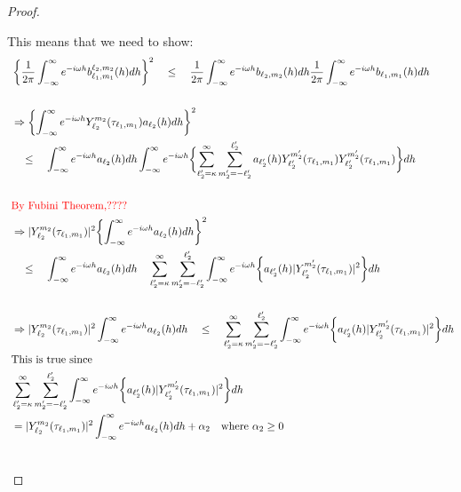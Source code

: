 \documentclass[11pt]{article}
\begin{document}
\begin{itemize}
\begin{proof}
\begin{enumerate}


This means that we need to show:\\
\begin{align*}
&\left\{ \frac{1}{2\pi} \int_{-\infty}^\infty e^{-i\omega h} b_{\ell_1,m_1}^{\ell_2,m_2}(h) dh \right\}^2 \quad \le \quad \frac{1}{2\pi} \int_{-\infty}^\infty e^{-i\omega h} b_{\ell_2,m_2}(h) dh \frac{1}{2\pi} \int_{-\infty}^\infty e^{-i\omega h} b_{\ell_1,m_1}(h) dh \\
\\
&\Rightarrow \left\{ \int_{-\infty}^\infty e^{-i\omega h} Y_{\ell_2}^{m_2}(\tau_{\ell_1,m_1}) a_{\ell_2}(h) dh \right\}^2\\ 
&\quad \le \quad \int_{-\infty}^\infty e^{-i\omega h} a_{\ell_2}(h) dh \int_{-\infty}^\infty e^{-i\omega h} \biggl\{ \sum_{\ell_2'=\kappa}^{\infty} \sum_{m_2'=-\ell_2'}^{\ell_2'} a_{\ell_2'}(h) Y_{\ell_2'}^{m_2'}(\tau_{\ell_1,m_1}) Y_{\ell_2'}^{m_2'}(\tau_{\ell_1,m_1}) \biggl\} dh\\
\\
&\text{{\color{red} By Fubini Theorem,????}}\\
&\Rightarrow |Y_{\ell_2}^{m_2}(\tau_{\ell_1,m_1})|^2 \biggl\{\int_{-\infty}^\infty e^{-i\omega h} a_{\ell_2}(h) dh \biggl\}^2\\
& \quad \le \quad \int_{-\infty}^\infty e^{-i\omega h} a_{\ell_2}(h) dh \quad \sum_{\ell_2'=\kappa}^{\infty} \sum_{m_2'=-\ell_2'}^{\ell_2'} \int_{-\infty}^\infty e^{-i\omega h} \biggl\{ a_{\ell_2'}(h) |Y_{\ell_2'}^{m_2'}(\tau_{\ell_1,m_1})|^2\biggl\} dh\\
\\
&\Rightarrow |Y_{\ell_2}^{m_2}(\tau_{\ell_1,m_1})|^2 \int_{-\infty}^\infty e^{-i\omega h} a_{\ell_2}(h) dh \quad \le \quad \sum_{\ell_2'=\kappa}^{\infty} \sum_{m_2'=-\ell_2'}^{\ell_2'} \int_{-\infty}^\infty e^{-i\omega h} \biggl\{ a_{\ell_2'}(h) |Y_{\ell_2'}^{m_2'}(\tau_{\ell_1,m_1})|^2\biggl\} dh\\
&\text{This is true since } \\
& \sum_{\ell_2'=\kappa}^{\infty} \sum_{m_2'=-\ell_2'}^{\ell_2'} \int_{-\infty}^\infty e^{-i\omega h} \biggl\{ a_{\ell_2'}(h) |Y_{\ell_2'}^{m_2'}(\tau_{\ell_1,m_1})|^2\biggl\} dh\\
&= |Y_{\ell_2}^{m_2}(\tau_{\ell_1,m_1})|^2 \int_{-\infty}^\infty e^{-i\omega h} a_{\ell_2}(h) dh  + \alpha_2 \quad \text{where } \alpha_2 \ge 0\\\
\end{align*}


\end{enumerate}
\end{proof}
\end{itemize}
\end{document}
